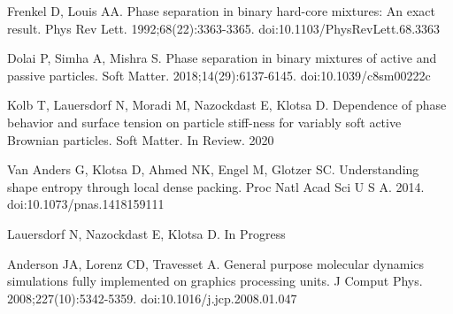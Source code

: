 \documentclass[11pt]{article}
\begin{document}
\begin{thebibliography}{9}
Frenkel D, Louis AA. Phase separation in binary hard-core mixtures: An exact result. Phys Rev Lett. 1992;68(22):3363-3365. doi:10.1103/PhysRevLett.68.3363

Dolai P, Simha A, Mishra S. Phase separation in binary mixtures of active and passive particles. Soft Matter. 2018;14(29):6137-6145. doi:10.1039/c8sm00222c

Kolb T, Lauersdorf N, Moradi M, Nazockdast E, Klotsa D. Dependence of phase behavior and surface tension on particle stiff-ness for variably soft active Brownian particles. Soft Matter. In Review. 2020

Van Anders G, Klotsa D, Ahmed NK, Engel M, Glotzer SC. Understanding shape entropy through local dense packing. Proc Natl Acad Sci U S A. 2014. doi:10.1073/pnas.1418159111

Lauersdorf N, Nazockdast E, Klotsa D. In Progress


Anderson JA, Lorenz CD, Travesset A. General purpose molecular dynamics simulations fully implemented on graphics processing units. J Comput Phys. 2008;227(10):5342-5359. doi:10.1016/j.jcp.2008.01.047










\end{thebibliography}
\end{document}
